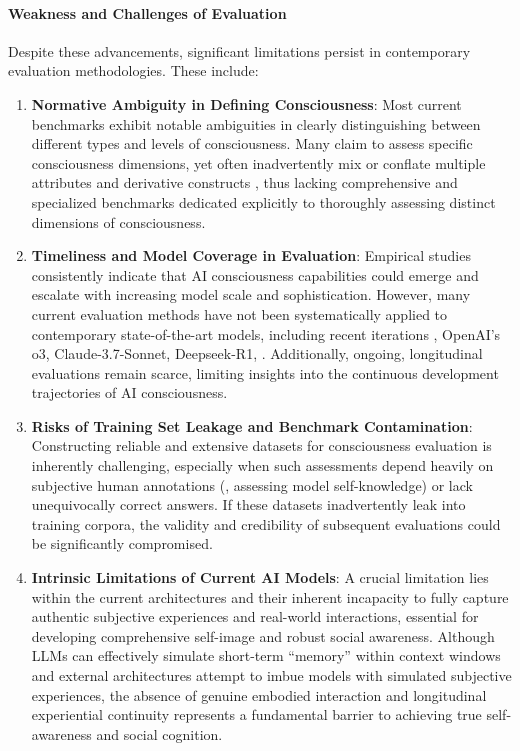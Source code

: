 \paragraph{Weakness and Challenges of Evaluation}
Despite these advancements, significant limitations persist in contemporary evaluation methodologies. These include:
\begin{enumerate}
\item \textbf{Normative Ambiguity in Defining Consciousness}: Most current benchmarks exhibit notable ambiguities in clearly distinguishing between different types and levels of consciousness. Many claim to assess specific consciousness dimensions, yet often inadvertently mix or conflate multiple attributes and derivative constructs \citep{li2024think, chen2024imitation}, thus lacking comprehensive and specialized benchmarks dedicated explicitly to thoroughly assessing distinct dimensions of consciousness.

\item \textbf{Timeliness and Model Coverage in Evaluation}: Empirical studies consistently indicate that AI consciousness capabilities could emerge and escalate with increasing model scale and sophistication. However, many current evaluation methods have not been systematically applied to contemporary state-of-the-art models, including recent iterations \eg, OpenAI's o3, Claude-3.7-Sonnet, Deepseek-R1, \etc. Additionally, ongoing, longitudinal evaluations remain scarce, limiting insights into the continuous development trajectories of AI consciousness.

\item \textbf{Risks of Training Set Leakage and Benchmark Contamination}: Constructing reliable and extensive datasets for consciousness evaluation is inherently challenging, especially when such assessments depend heavily on subjective human annotations (\eg, assessing model self-knowledge)  \citep{laine2024me} or lack unequivocally correct answers. If these datasets inadvertently leak into training corpora, the validity and credibility of subsequent evaluations could be significantly compromised.

\item \textbf{Intrinsic Limitations of Current AI Models}: A crucial limitation lies within the current architectures and their inherent incapacity to fully capture authentic subjective experiences and real-world interactions, essential for developing comprehensive self-image and robust social awareness. Although LLMs can effectively simulate short-term ``memory'' within context windows \citep{park2023generative} and external architectures  \citep{das2024larimar} attempt to imbue models with simulated subjective experiences, the absence of genuine embodied interaction and longitudinal experiential continuity represents a fundamental barrier to achieving true self-awareness and social cognition.
\end{enumerate}

